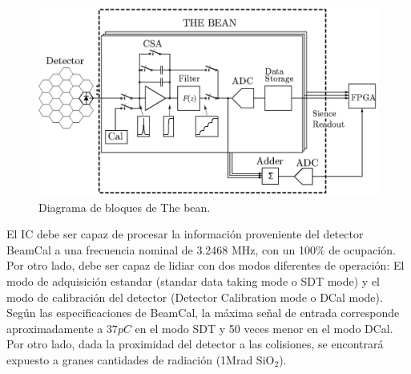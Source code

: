 \begin{figure}[!t]
	\centering
	\includegraphics[width=5in]{./figures/thebeamdiagram-02.eps}
	\caption{Diagrama de bloques de The bean.}\label{fig:thebean_diagram}
\end{figure}
 
El IC debe ser capaz de procesar la información proveniente del detector BeamCal a una frecuencia nominal de 3.2468 MHz, con un 100\% de ocupación. Por otro lado, debe ser capaz de lidiar con dos modos diferentes de operación: El modo de adquisición estandar (standar data taking mode o SDT mode) y el modo de calibración del detector (Detector Calibration mode o DCal mode). Según las especificaciones de BeamCal, la máxima señal de entrada corresponde aproximadamente a $37pC$ en el modo SDT  y 50 veces menor en el modo DCal.
Por otro lado, dada la proximidad del detector a las colisiones, se encontrará expuesto a granes cantidades de radiación (1Mrad $\text{SiO}_2$).

